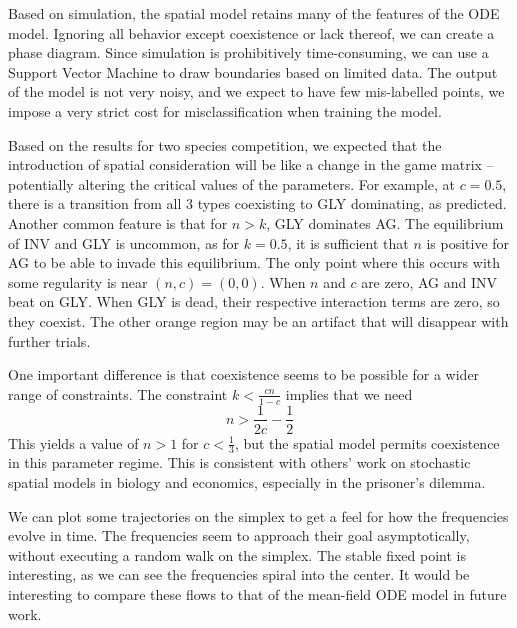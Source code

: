 \documentclass[12pt]{report}
\begin{document}
Based on simulation, the spatial model retains many of the features of the ODE model. Ignoring all behavior except coexistence or lack thereof, we can create a phase diagram. Since simulation is prohibitively time-consuming, we can use a Support Vector Machine to draw boundaries based on limited data. The output of the model is not very noisy, and we expect to have few mis-labelled points, we impose a very strict cost for misclassification when training the model.

 Based on the results for two species competition, we expected that the introduction of spatial consideration will be like a change in the game matrix -- potentially altering the critical values of the parameters. For example, at $c = 0.5$, there is a transition from all 3 types coexisting to GLY dominating, as predicted. Another common feature is that for $n > k$, GLY dominates AG.  The equilibrium of INV and GLY is uncommon, as for $k = 0.5$, it is sufficient that $n$ is positive for AG to be able to invade this equilibrium. The only point where this occurs with some regularity is near $(n,c) = (0,0)$. When $n$ and $c$ are zero, AG and INV beat on GLY. When GLY is dead, their respective interaction terms are zero, so they coexist. The other orange region may be an artifact that will disappear with further trials.

One important difference is that coexistence seems to be possible for a wider range of constraints. The constraint $k < \frac{cn}{1-c}$ implies that we need 
$$n > \frac{1}{2c} - \frac{1}{2}$$
This yields a value of $n > 1$ for $c < \frac{1}{3}$, but the spatial model permits coexistence in this parameter regime. This is consistent with others' work on stochastic spatial models in biology and economics, especially in the prisoner's dilemma\cite{Durrett2009}. 

We can plot some trajectories on the simplex to get a feel for how the frequencies evolve in time. The frequencies seem to approach their goal asymptotically, without executing a random walk on the simplex. The stable fixed point is interesting, as we can see the frequencies spiral into the center. It would be interesting to compare these flows to that of the mean-field ODE model in future work.  
\end{document}
